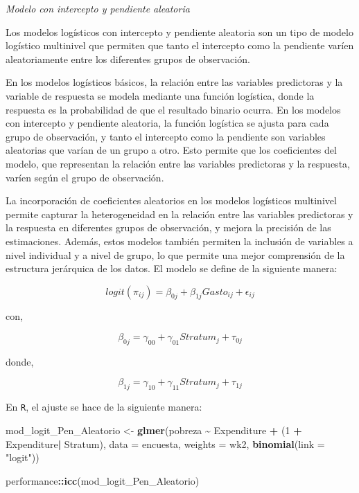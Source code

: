 \documentclass[
  spanish,
  12pt,
]{book}
\newenvironment{Shaded}{\begin{snugshade}}{\end{snugshade}}
\newcommand{\AttributeTok}[1]{\textcolor[rgb]{0.13,0.29,0.53}{#1}}
\newcommand{\DecValTok}[1]{\textcolor[rgb]{0.00,0.00,0.81}{#1}}
\newcommand{\FunctionTok}[1]{\textcolor[rgb]{0.13,0.29,0.53}{\textbf{#1}}}
\newcommand{\NormalTok}[1]{#1}
\newcommand{\OtherTok}[1]{\textcolor[rgb]{0.56,0.35,0.01}{#1}}
\newcommand{\SpecialCharTok}[1]{\textcolor[rgb]{0.81,0.36,0.00}{\textbf{#1}}}
\newcommand{\StringTok}[1]{\textcolor[rgb]{0.31,0.60,0.02}{#1}}
\begin{document}
\emph{Modelo con intercepto y pendiente aleatoria}

Los modelos logísticos con intercepto y pendiente aleatoria son un tipo de modelo logístico multinivel que permiten que tanto el intercepto como la pendiente varíen aleatoriamente entre los diferentes grupos de observación.

En los modelos logísticos básicos, la relación entre las variables predictoras y la variable de respuesta se modela mediante una función logística, donde la respuesta es la probabilidad de que el resultado binario ocurra. En los modelos con intercepto y pendiente aleatoria, la función logística se ajusta para cada grupo de observación, y tanto el intercepto como la pendiente son variables aleatorias que varían de un grupo a otro. Esto permite que los coeficientes del modelo, que representan la relación entre las variables predictoras y la respuesta, varíen según el grupo de observación.

La incorporación de coeficientes aleatorios en los modelos logísticos multinivel permite capturar la heterogeneidad en la relación entre las variables predictoras y la respuesta en diferentes grupos de observación, y mejora la precisión de las estimaciones. Además, estos modelos también permiten la inclusión de variables a nivel individual y a nivel de grupo, lo que permite una mejor comprensión de la estructura jerárquica de los datos. El modelo se define de la siguiente manera:

\[
logit(\pi_{ij})=\beta_{0j}+\beta_{1j}Gasto_{ij}+\epsilon_{ij}
\]

con,

\[
\beta_{0j} = \gamma_{00}+\gamma_{01}Stratum_{j} + \tau_{0j}
\]

donde,

\[
\beta_{1j} = \gamma_{10}+\gamma_{11}Stratum_{j} + \tau_{1j}
\]

En \texttt{R}, el ajuste se hace de la siguiente manera:

\begin{Shaded}
\begin{Highlighting}[]
\NormalTok{mod\_logit\_Pen\_Aleatorio }\OtherTok{\textless{}{-}} \FunctionTok{glmer}\NormalTok{(pobreza }\SpecialCharTok{\textasciitilde{}}\NormalTok{ Expenditure  }\SpecialCharTok{+}\NormalTok{ (}\DecValTok{1} \SpecialCharTok{+}\NormalTok{ Expenditure}\SpecialCharTok{|}\NormalTok{ Stratum),}
  \AttributeTok{data =}\NormalTok{ encuesta, }\AttributeTok{weights  =}\NormalTok{  wk2, }\FunctionTok{binomial}\NormalTok{(}\AttributeTok{link =} \StringTok{"logit"}\NormalTok{))}

\NormalTok{performance}\SpecialCharTok{::}\FunctionTok{icc}\NormalTok{(mod\_logit\_Pen\_Aleatorio)}
\end{Highlighting}
\end{Shaded}
\end{document}
